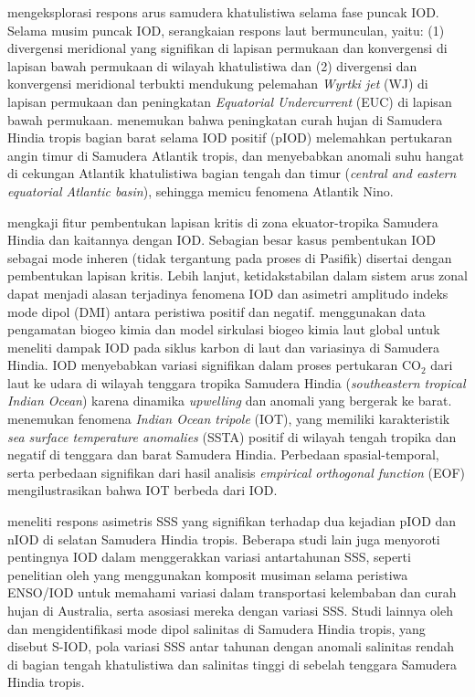 \begin{spacing}{1.5}
	 mengeksplorasi respons arus samudera khatulistiwa selama fase puncak IOD. Selama musim puncak IOD, serangkaian respons laut bermunculan, yaitu: (1) divergensi meridional yang signifikan di lapisan permukaan dan konvergensi di lapisan bawah permukaan di wilayah khatulistiwa dan (2) divergensi dan konvergensi meridional terbukti mendukung pelemahan \textit{Wyrtki jet} (WJ) di lapisan permukaan dan peningkatan \textit{Equatorial Undercurrent} (EUC) di lapisan bawah permukaan.  menemukan bahwa peningkatan curah hujan di Samudera Hindia tropis bagian barat selama IOD positif (pIOD) melemahkan pertukaran angin timur di Samudera Atlantik tropis, dan menyebabkan anomali suhu hangat di cekungan Atlantik khatulistiwa bagian tengah dan timur (\textit{central and eastern equatorial Atlantic basin}), sehingga memicu fenomena Atlantik Nino.
	
	 mengkaji fitur pembentukan lapisan kritis di zona ekuator-tropika Samudera Hindia dan kaitannya dengan IOD. Sebagian besar kasus pembentukan IOD sebagai mode inheren (tidak tergantung pada proses di Pasifik) disertai dengan pembentukan lapisan kritis. Lebih lanjut, ketidakstabilan dalam sistem arus zonal dapat menjadi alasan terjadinya fenomena IOD dan asimetri amplitudo indeks mode dipol (DMI) antara peristiwa positif dan negatif.  menggunakan data pengamatan biogeo kimia dan model sirkulasi biogeo kimia laut global untuk meneliti dampak IOD pada siklus karbon di laut dan variasinya di Samudera Hindia. IOD menyebabkan variasi signifikan dalam proses pertukaran CO$_2$ dari laut ke udara di wilayah tenggara tropika Samudera Hindia (\textit{southeastern tropical Indian Ocean}) karena dinamika \textit{upwelling} dan anomali yang bergerak ke barat.  menemukan fenomena \textit{Indian Ocean tripole} (IOT), yang memiliki karakteristik \textit{sea surface temperature anomalies} (SSTA) positif di wilayah tengah tropika dan negatif di tenggara dan barat Samudera Hindia. Perbedaan spasial-temporal, serta perbedaan signifikan dari hasil analisis \textit{empirical orthogonal function} (EOF) mengilustrasikan bahwa IOT berbeda dari IOD. 
	
	 meneliti respons asimetris SSS yang signifikan terhadap dua kejadian pIOD dan nIOD di selatan Samudera Hindia tropis. Beberapa studi lain juga menyoroti pentingnya IOD dalam menggerakkan variasi antartahunan SSS, seperti penelitian oleh  yang menggunakan komposit musiman selama peristiwa ENSO/IOD untuk memahami variasi dalam transportasi kelembaban dan curah hujan di Australia, serta asosiasi mereka dengan variasi SSS. Studi lainnya oleh  dan  mengidentifikasi mode dipol salinitas di Samudera Hindia tropis, yang disebut S-IOD, pola variasi SSS antar tahunan dengan anomali salinitas rendah di bagian tengah khatulistiwa dan salinitas tinggi di sebelah tenggara Samudera Hindia tropis.
	

\end{spacing}
